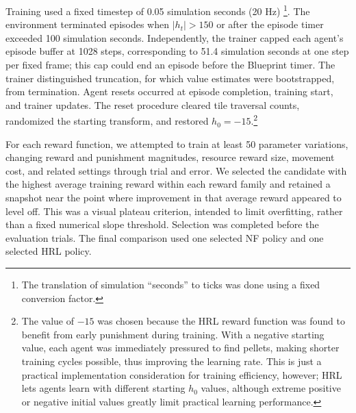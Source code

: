 \documentclass[12pt,fleqn]{article}
\begin{document}
Training used a fixed timestep of 0.05 simulation seconds (20 Hz) \footnote{The translation of simulation ``seconds'' to ticks was done using a fixed conversion factor.}. The environment terminated episodes when $|h_t|>150$ or after the episode timer exceeded 100 simulation seconds. Independently, the trainer capped each agent's episode buffer at 1028 steps, corresponding to 51.4 simulation seconds at one step per fixed frame; this cap could end an episode before the Blueprint timer. The trainer distinguished truncation, for which value estimates were bootstrapped, from termination. Agent resets occurred at episode completion, training start, and trainer updates. The reset procedure cleared tile traversal counts, randomized the starting transform, and restored $h_0=-15$.\footnote{The value of \(-15\) was chosen because the HRL reward function was found to benefit from early punishment during training. With a negative starting value, each agent was immediately pressured to find pellets, making shorter training cycles possible, thus improving the learning rate. This is just a practical implementation consideration for training efficiency, however; HRL lets agents learn with different starting \(h_0\) values, although extreme positive or negative initial values greatly limit practical learning performance.}

For each reward function, we attempted to train at least 50 parameter variations, changing reward and punishment magnitudes, resource reward size, movement cost, and related settings through trial and error. We selected the candidate with the highest average training reward within each reward family and retained a snapshot near the point where improvement in that average reward appeared to level off. This was a visual plateau criterion, intended to limit overfitting, rather than a fixed numerical slope threshold. Selection was completed before the evaluation trials. The final comparison used one selected NF policy and one selected HRL policy.


\end{document}
